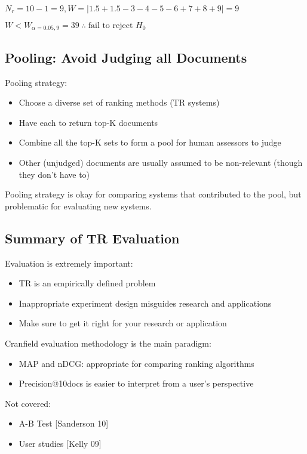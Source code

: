$N_r = 10 - 1 = 9, W = |1.5+1.5-3-4-5-6+7+8+9| = 9$

$W < W_{\alpha = 0.05, 9} = 39 \; \therefore \; \text{fail to reject } H_0$

\subsection{Pooling: Avoid Judging all Documents}
Pooling strategy:
\begin{itemize}
\item Choose a diverse set of ranking methods (TR systems)
\item Have each to return top-K documents
\item Combine all the top-K sets to form a pool for human assessors to judge
\item Other (unjudged) documents are usually assumed to be non-relevant (though they don’t have to)
\end{itemize}

Pooling strategy is okay for comparing systems that contributed to the pool, but problematic for evaluating new systems.

\subsection{Summary of TR Evaluation}
Evaluation is extremely important:
\begin{itemize}
\item TR is an empirically defined problem
\item Inappropriate experiment design misguides research and applications 
\item Make sure to get it right for your research or application
\end{itemize}

Cranfield evaluation methodology is the main paradigm:
\begin{itemize}
\item MAP and nDCG: appropriate for comparing ranking algorithms
\item Precision@10docs is easier to interpret from a user’s perspective
\end{itemize}

Not covered:
\begin{itemize}
\item A-B Test [Sanderson 10] 
\item User studies [Kelly 09]
\end{itemize}

